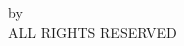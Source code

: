 \chapter*{}\label{chap:Copyright}

\begin{center}
  \vspace*{7in}
  \textcopyright \yourYear{} by \yourName\\
  ALL RIGHTS RESERVED
\end{center}
